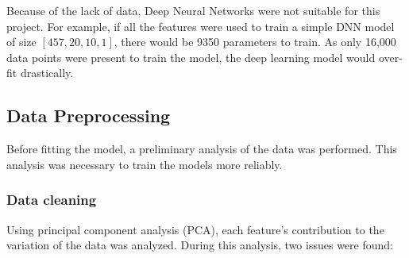 \documentclass[11pt]{article}
\begin{document}
Because of the lack of data, Deep Neural Networks were not suitable for this project. 
For example, if all the features were used to train a simple DNN model of size $[457,  20, 10,  1]$,  there would be 9350 parameters to train.  As only 16,000 data points were present to train the model,  the deep learning model would over-fit drastically.

\subsection{Data Preprocessing}
Before fitting the model,  a preliminary analysis of the data was performed.  This analysis was necessary to train the models more reliably.

\subsubsection{Data cleaning}
Using principal component analysis (PCA), each feature's contribution to the variation of the data was analyzed. 
During this analysis, two issues were found:
\end{document}

